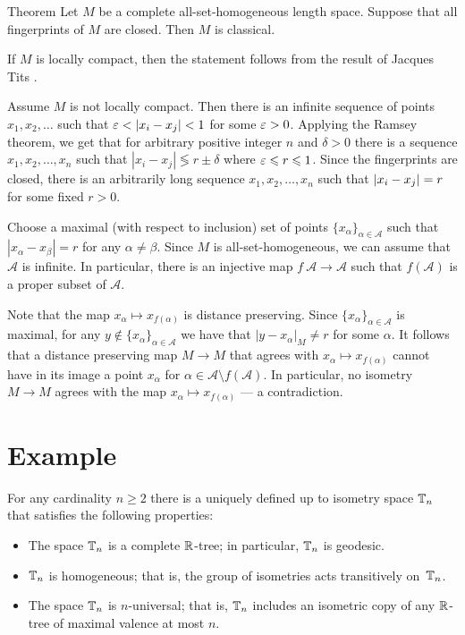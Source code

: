 \documentclass[a4paper,10pt]{article}
\begin{document}
\begin{thm}{Theorem}\label{all-sets}
Let $M$ be a complete all-set-homogeneous length space.
Suppose that all fingerprints of $M$ are closed.
Then $M$ is classical.
\end{thm}

If $M$ is locally compact, then the statement follows from the result of Jacques Tits \cite{tits}.

Assume $M$ is not locally compact.
Then there is an infinite sequence of points $x_1,x_2,\dots$ such that 
$\eps<|x_i-x_j|<1$ for some $\varepsilon>0$.
Applying the Ramsey theorem, we get that for arbitrary positive integer $n$ and $\delta>0$ there is a sequence $x_1,x_2,\dots,x_n$ such that 
$|x_i-x_j|\lessgtr r\pm \delta$ where $\varepsilon \leqslant r\leqslant 1$.
Since the fingerprints are closed, there is an arbitrarily long sequence 
$x_1,x_2,\dots,x_n$ such that 
$|x_i\z-x_j|= r$ for some fixed $r>0$.

Choose a maximal (with respect to inclusion) set of points $\{x_\alpha\}_{\alpha\in \mathcal{A}}$ such that $|x_\alpha-x_\beta|=r$ for any $\alpha\ne \beta$.
Since $M$ is all-set-homogeneous, we can assume that $\mathcal{A}$ is infinite.
In particular, there is an injective map $f\:\mathcal{A}\to\mathcal{A}$ such that $f(\mathcal{A})$ is a proper subset of $\mathcal{A}$.

Note that the map $x_\alpha\mapsto x_{f(\alpha)}$ is distance preserving.
Since $\{x_\alpha\}_{\alpha\in \mathcal{A}}$ is maximal, for any $y\notin \{x_\alpha\}_{\alpha\in \mathcal{A}}$ we have that $|y-x_\alpha|_M\ne r$ for some $\alpha$.
It follows that a distance preserving map $M\to M$ that agrees with $x_\alpha\mapsto x_{f(\alpha)}$ cannot have in its image a point $x_\alpha$ for $\alpha\in \mathcal{A}\setminus f(\mathcal{A})$.
In particular, no isometry $M\to M$ agrees with the map $x_\alpha\mapsto x_{f(\alpha)}$ --- a contradiction.
\qeds

\section{Example}

For any cardinality $n\ge 2$ there is a uniquely defined up to isometry space $\mathbb{T}_n$ that satisfies the following properties:
\begin{itemize}
\item The space $\mathbb{T}_n$ is a complete $\mathbb{R}$-tree; in particular, $\mathbb{T}_n$ is geodesic.
\item $\mathbb{T}_n$ is homogeneous; that is, the group of isometries acts transitively on~$\mathbb{T}_n$.
\item The space $\mathbb{T}_n$ is $n$-universal; that is, $\mathbb{T}_n$ includes an isometric copy of any $\mathbb{R}$-tree of maximal valence at most $n$. 
\end{itemize}
\end{document}
